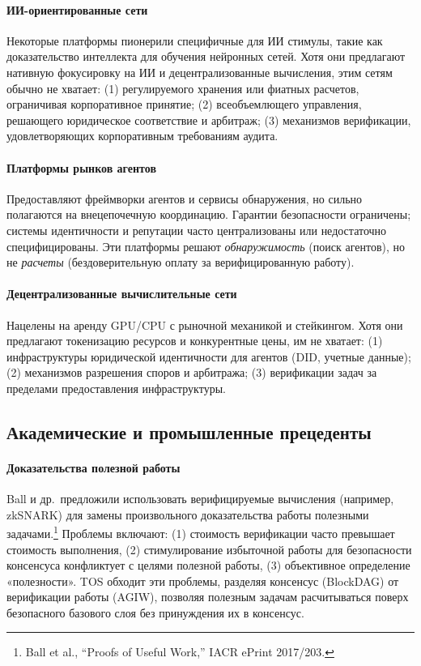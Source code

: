 \documentclass[11pt]{article}
\begin{document}
\paragraph{ИИ-ориентированные сети} Некоторые платформы пионерили специфичные для ИИ стимулы, такие как доказательство интеллекта для обучения нейронных сетей. Хотя они предлагают нативную фокусировку на ИИ и децентрализованные вычисления, этим сетям обычно не хватает: (1) регулируемого хранения или фиатных расчетов, ограничивая корпоративное принятие; (2) всеобъемлющего управления, решающего юридическое соответствие и арбитраж; (3) механизмов верификации, удовлетворяющих корпоративным требованиям аудита.

\paragraph{Платформы рынков агентов} Предоставляют фреймворки агентов и сервисы обнаружения, но сильно полагаются на внецепочечную координацию. Гарантии безопасности ограничены; системы идентичности и репутации часто централизованы или недостаточно специфицированы. Эти платформы решают \emph{обнаружимость} (поиск агентов), но не \emph{расчеты} (бездоверительную оплату за верифицированную работу).

\paragraph{Децентрализованные вычислительные сети} Нацелены на аренду GPU/CPU с рыночной механикой и стейкингом. Хотя они предлагают токенизацию ресурсов и конкурентные цены, им не хватает: (1) инфраструктуры юридической идентичности для агентов (DID, учетные данные); (2) механизмов разрешения споров и арбитража; (3) верификации задач за пределами предоставления инфраструктуры.

\subsection{Академические и промышленные прецеденты}
\paragraph{Доказательства полезной работы} Ball и др.\ предложили использовать верифицируемые вычисления (например, zkSNARK) для замены произвольного доказательства работы полезными задачами.\footnote{Ball et al., ``Proofs of Useful Work,'' IACR ePrint 2017/203.} Проблемы включают: (1) стоимость верификации часто превышает стоимость выполнения, (2) стимулирование избыточной работы для безопасности консенсуса конфликтует с целями полезной работы, (3) объективное определение «полезности». TOS обходит эти проблемы, разделяя консенсус (BlockDAG) от верификации работы (AGIW), позволяя полезным задачам расчитываться поверх безопасного базового слоя без принуждения их в консенсус.
\end{document}
